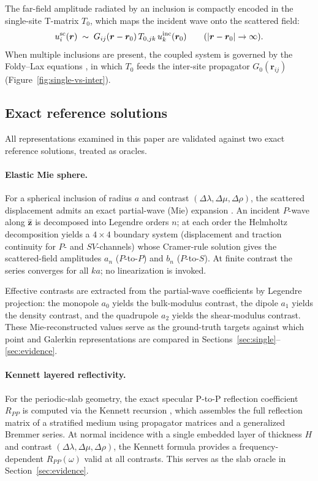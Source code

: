 \documentclass[11pt,a4paper]{article}
\newcommand{\D}{\Delta}
\newcommand{\br}{\bm{r}}
\theoremstyle{plain}
\theoremstyle{definition}
\theoremstyle{remark}
\begin{document}
The far-field amplitude radiated by an inclusion is compactly encoded in
the single-site T-matrix $T_0$, which maps the incident wave onto the
scattered field:
\begin{equation}
  u_i^{\rm sc}(\br) \;\sim\; G_{ij}(\br - \br_0)\,T_{0,jk}\,u_k^{\rm inc}(\br_0)
  \qquad (|\br - \br_0| \to \infty).
\end{equation}
When multiple inclusions are present, the coupled system is governed by
the Foldy--Lax equations \cite{foldy1945,lax1951}, in which $T_0$ feeds
the inter-site propagator $G_0(\br_{ij})$ (Figure~\ref{fig:single-vs-inter}).

\subsection{Exact reference solutions}
\label{sec:oracles}

All representations examined in this paper are validated against two
exact reference solutions, treated as oracles.

\paragraph{Elastic Mie sphere.}
For a spherical inclusion of radius $a$ and contrast
$(\D\lambda, \D\mu, \D\rho)$, the scattered displacement admits an
exact partial-wave (Mie) expansion \cite{yingtruell1956}.  An incident
$P$-wave along $\hat{\bm{z}}$ is decomposed into Legendre orders $n$;
at each order the Helmholtz decomposition yields a $4\times4$ boundary
system (displacement and traction continuity for $P$- and $SV$-channels)
whose Cramer-rule solution gives the scattered-field amplitudes
$a_n$ ($P$-to-$P$) and $b_n$ ($P$-to-$S$).  At finite contrast the
series converges for all $ka$; no linearization is invoked.

Effective contrasts are extracted from the partial-wave coefficients
by Legendre projection: the monopole $a_0$ yields the bulk-modulus
contrast, the dipole $a_1$ yields the density contrast, and the
quadrupole $a_2$ yields the shear-modulus contrast.  These
Mie-reconstructed values serve as the ground-truth targets against
which point and Galerkin representations are compared in
Sections~\ref{sec:single}--\ref{sec:evidence}.

\paragraph{Kennett layered reflectivity.}
For the periodic-slab geometry, the exact specular P-to-P reflection
coefficient $R_{PP}$ is computed via the Kennett recursion \cite{kennett1983},
which assembles the full reflection matrix of a stratified medium using
propagator matrices and a generalized Bremmer series.  At normal
incidence with a single embedded layer of thickness $H$ and contrast
$(\D\lambda,\D\mu,\D\rho)$, the Kennett formula provides a
frequency-dependent $R_{PP}(\omega)$ valid at all contrasts.  This
serves as the slab oracle in Section~\ref{sec:evidence}.
\end{document}
